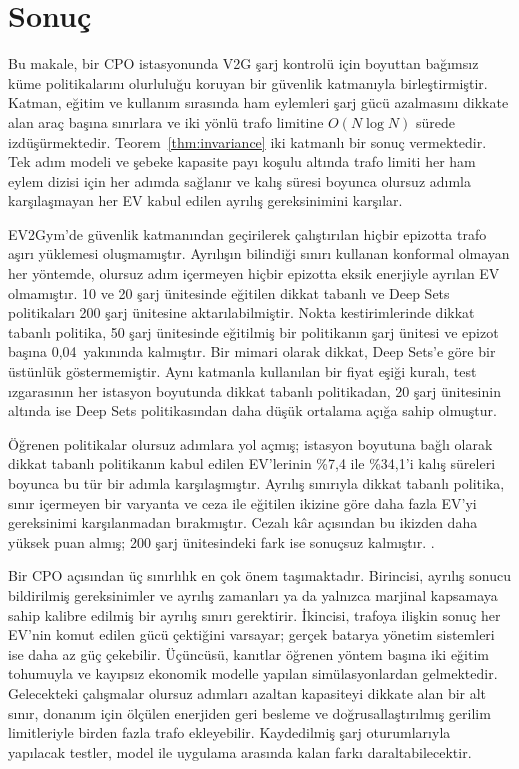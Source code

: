 \section{Sonuç}\label{sec:conclusion}

Bu makale, bir CPO istasyonunda V2G şarj kontrolü için boyuttan bağımsız küme politikalarını olurluluğu koruyan bir güvenlik katmanıyla birleştirmiştir.
Katman, eğitim ve kullanım sırasında ham eylemleri şarj gücü azalmasını dikkate alan araç başına sınırlara ve iki yönlü trafo limitine $O(N\log N)$ sürede izdüşürmektedir.
Teorem~\ref{thm:invariance} iki katmanlı bir sonuç vermektedir.
Tek adım modeli ve şebeke kapasite payı koşulu altında trafo limiti her ham eylem dizisi için her adımda sağlanır ve kalış süresi boyunca olursuz adımla karşılaşmayan her EV kabul edilen ayrılış gereksinimini karşılar.

EV2Gym'de güvenlik katmanından geçirilerek çalıştırılan hiçbir epizotta trafo aşırı yüklemesi oluşmamıştır.
Ayrılışın bilindiği sınırı kullanan konformal olmayan her yöntemde, olursuz adım içermeyen hiçbir epizotta eksik enerjiyle ayrılan EV olmamıştır.
10 ve 20 şarj ünitesinde eğitilen dikkat tabanlı ve Deep Sets politikaları 200 şarj ünitesine aktarılabilmiştir.
Nokta kestirimlerinde dikkat tabanlı politika, 50 şarj ünitesinde eğitilmiş bir politikanın şarj ünitesi ve epizot başına 0,04\,\texteuro{} yakınında kalmıştır.
Bir mimari olarak dikkat, Deep Sets'e göre bir üstünlük göstermemiştir.
Aynı katmanla kullanılan bir fiyat eşiği kuralı, test ızgarasının her istasyon boyutunda dikkat tabanlı politikadan, 20 şarj ünitesinin altında ise Deep Sets politikasından daha düşük ortalama açığa sahip olmuştur.

Öğrenen politikalar olursuz adımlara yol açmış; istasyon boyutuna bağlı olarak dikkat tabanlı politikanın kabul edilen EV'lerinin \%7,4 ile \%34,1'i kalış süreleri boyunca bu tür bir adımla karşılaşmıştır.
Ayrılış sınırıyla dikkat tabanlı politika, sınır içermeyen bir varyanta ve ceza ile eğitilen ikizine göre daha fazla EV'yi gereksinimi karşılanmadan bırakmıştır.
Cezalı kâr açısından bu ikizden daha yüksek puan almış; 200 şarj ünitesindeki fark ise sonuçsuz kalmıştır.
.

Bir CPO açısından üç sınırlılık en çok önem taşımaktadır.
Birincisi, ayrılış sonucu bildirilmiş gereksinimler ve ayrılış zamanları ya da yalnızca marjinal kapsamaya sahip kalibre edilmiş bir ayrılış sınırı gerektirir.
İkincisi, trafoya ilişkin sonuç her EV'nin komut edilen gücü çektiğini varsayar; gerçek batarya yönetim sistemleri ise daha az güç çekebilir.
Üçüncüsü, kanıtlar öğrenen yöntem başına iki eğitim tohumuyla ve kayıpsız ekonomik modelle yapılan simülasyonlardan gelmektedir.
Gelecekteki çalışmalar olursuz adımları azaltan kapasiteyi dikkate alan bir alt sınır, donanım için ölçülen enerjiden geri besleme ve doğrusallaştırılmış gerilim limitleriyle birden fazla trafo ekleyebilir.
Kaydedilmiş şarj oturumlarıyla yapılacak testler, model ile uygulama arasında kalan farkı daraltabilecektir.
